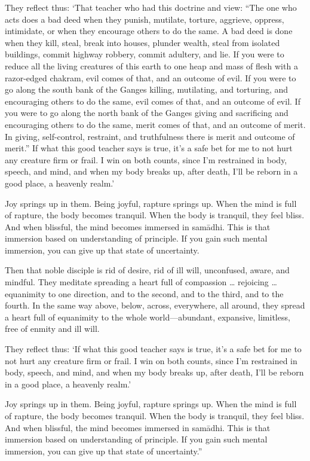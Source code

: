 \documentclass[12pt,openany]{book}%
\begin{document}
They reflect thus: ‘That teacher who had this doctrine and view: “The one who acts does a bad deed when they punish, mutilate, torture, aggrieve, oppress, intimidate, or when they encourage others to do the same. A bad deed is done when they kill, steal, break into houses, plunder wealth, steal from isolated buildings, commit highway robbery, commit adultery, and lie. If you were to reduce all the living creatures of this earth to one heap and mass of flesh with a razor-edged chakram, evil comes of that, and an outcome of evil. If you were to go along the south bank of the Ganges killing, mutilating, and torturing, and encouraging others to do the same, evil comes of that, and an outcome of evil. If you were to go along the north bank of the Ganges giving and sacrificing and encouraging others to do the same, merit comes of that, and an outcome of merit. In giving, self-control, restraint, and truthfulness there is merit and outcome of merit.” If what this good teacher says is true, it’s a safe bet for me to not hurt any creature firm or frail. I win on both counts, since I’m restrained in body, speech, and mind, and when my body breaks up, after death, I’ll be reborn in a good place, a heavenly realm.’ 

Joy springs up in them. Being joyful, rapture springs up. When the mind is full of rapture, the body becomes tranquil. When the body is tranquil, they feel bliss. And when blissful, the mind becomes immersed in \textsanskrit{samādhi}. This is that immersion based on understanding of principle. If you gain such mental immersion, you can give up that state of uncertainty. 

Then that noble disciple is rid of desire, rid of ill will, unconfused, aware, and mindful. They meditate spreading a heart full of compassion … rejoicing … equanimity to one direction, and to the second, and to the third, and to the fourth. In the same way above, below, across, everywhere, all around, they spread a heart full of equanimity to the whole world—abundant, expansive, limitless, free of enmity and ill will. 

They reflect thus: ‘If what this good teacher says is true, it’s a safe bet for me to not hurt any creature firm or frail. I win on both counts, since I’m restrained in body, speech, and mind, and when my body breaks up, after death, I’ll be reborn in a good place, a heavenly realm.’ 

Joy springs up in them. Being joyful, rapture springs up. When the mind is full of rapture, the body becomes tranquil. When the body is tranquil, they feel bliss. And when blissful, the mind becomes immersed in \textsanskrit{samādhi}. This is that immersion based on understanding of principle. If you gain such mental immersion, you can give up that state of uncertainty.” 
\end{document}

